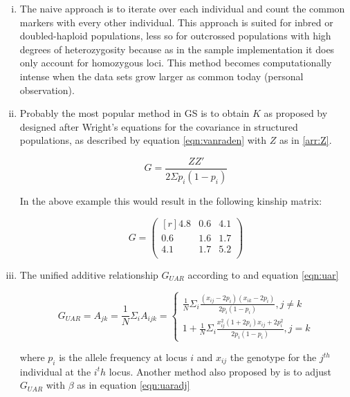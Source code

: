 \begin{enumerate}[(i)]
\item The naive approach is to iterate over each individual and count the common markers
  with every other individual. This approach is suited for inbred or doubled-haploid
  populations, less so for outcrossed populations with high degrees of heterozygosity
  because as in the sample implementation it does only account for homozygous loci. This
  method becomes computationally intense when the data sets grow larger as common today
  (personal observation).
\item Probably the most popular method in GS is to obtain $K$ as proposed by
  \cite{vanraden2008efficient} designed after Wright's equations
  \cite{wright1922coefficients} for the covariance in structured populations, as described
  by equation \ref{eqn:vanraden} with $Z$ as in \ref{arr:Z}.

\begin{equation}
 G = \frac{ZZ'}{2 \Sigma p_i (1-p_i)} 
\label{eqn:vanraden}
\end{equation}

In the above example this would result in the following kinship matrix:

\begin{equation}
 G = 
 \begin{pmatrix}[r]
  4.8 & 0.6 & 4.1  \\
  0.6 & 1.6 & 1.7  \\
  4.1 & 1.7 & 5.2  \\
 \end{pmatrix}
 \label{arr:Gship}
\end{equation}


\item The unified additive relationship $G_{UAR}$ according to \cite{yang2010common} and equation \ref{eqn:uar}

\begin{equation}
 G_{UAR} = A_{jk} = \frac{1}{N} \Sigma_i{A_{ijk}} = \left\{
  \!\begin{aligned}
   \frac{1}{N} \Sigma_{i} \frac{(x_{ij} - 2p_i)(x_{ik} - 2p_i)}{2p_i (1-p_i)}, j \ne k \\
   1 + \frac{1}{N} \Sigma_i \frac{x_{ij}^2 (1+2p_i) x_{ij} + 2p_i^2 }{2p_i (1-p_i)}, j = k   
  \end{aligned}
 \right.
 \label{eqn:uar}
\end{equation}

where $p_i$ is the allele frequency at locus $i$ and $x_{ij}$ the genotype for the
$j^{th}$ individual at the $i^th$ locus. Another method also proposed by
\cite{yang2010common} is to adjust $G_{UAR}$ with $\beta$ as in equation \ref{eqn:uaradj}


\end{enumerate}
